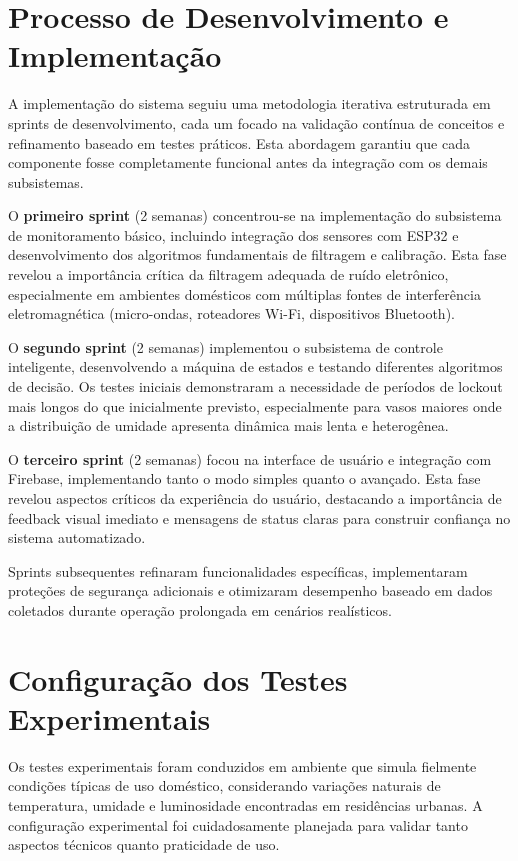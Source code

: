 \documentclass[twoside,english,brazilian]{UNISINOSmonografia}
\begin{document}
\section{Processo de Desenvolvimento e Implementação}

A implementação do sistema seguiu uma metodologia iterativa estruturada em sprints de desenvolvimento, cada um focado na validação contínua de conceitos e refinamento baseado em testes práticos. Esta abordagem garantiu que cada componente fosse completamente funcional antes da integração com os demais subsistemas.

O \textbf{primeiro sprint} (2 semanas) concentrou-se na implementação do subsistema de monitoramento básico, incluindo integração dos sensores com ESP32 e desenvolvimento dos algoritmos fundamentais de filtragem e calibração. Esta fase revelou a importância crítica da filtragem adequada de ruído eletrônico, especialmente em ambientes domésticos com múltiplas fontes de interferência eletromagnética (micro-ondas, roteadores Wi-Fi, dispositivos Bluetooth).

O \textbf{segundo sprint} (2 semanas) implementou o subsistema de controle inteligente, desenvolvendo a máquina de estados e testando diferentes algoritmos de decisão. Os testes iniciais demonstraram a necessidade de períodos de lockout mais longos do que inicialmente previsto, especialmente para vasos maiores onde a distribuição de umidade apresenta dinâmica mais lenta e heterogênea.

O \textbf{terceiro sprint} (2 semanas) focou na interface de usuário e integração com Firebase, implementando tanto o modo simples quanto o avançado. Esta fase revelou aspectos críticos da experiência do usuário, destacando a importância de feedback visual imediato e mensagens de status claras para construir confiança no sistema automatizado.

Sprints subsequentes refinaram funcionalidades específicas, implementaram proteções de segurança adicionais e otimizaram desempenho baseado em dados coletados durante operação prolongada em cenários realísticos.

\section{Configuração dos Testes Experimentais}

Os testes experimentais foram conduzidos em ambiente que simula fielmente condições típicas de uso doméstico, considerando variações naturais de temperatura, umidade e luminosidade encontradas em residências urbanas. A configuração experimental foi cuidadosamente planejada para validar tanto aspectos técnicos quanto praticidade de uso.
\end{document}
